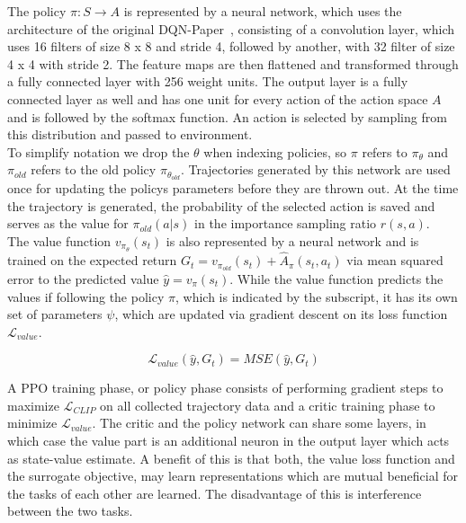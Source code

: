 \documentclass{article}
\begin{document}
\noindent The policy $\pi : S \xrightarrow{} A$ is represented by a neural network, which uses
the architecture of the original DQN-Paper~\cite{DBLP:journals/corr/MnihKSGAWR13}, consisting of
a convolution layer, which uses 16 filters of size 8 x 8 and stride 4,
followed by another, with 32 filter of size 4 x 4 with stride 2. The feature maps are then
flattened and transformed through a fully connected layer with 256 weight units.
The output layer is a fully connected layer as well and has one unit for every
action of the action space $A$ and is followed by the softmax function. 
An action is selected by sampling from this distribution and passed to environment.\\
To simplify notation we drop the $\theta$ when indexing policies, so $\pi$ refers to $\pi_\theta$ and
$\pi_{old}$ refers to the old policy $\pi_{\theta_{old}}$.
Trajectories generated by this network are used once for updating the policys
parameters before they are thrown out. At the time the trajectory is generated,
the probability of the selected action is saved and serves as the value for
$\pi_{old}(a|s)$ in the importance sampling ratio $r(s,a)$.\\
The value function $v_{\pi_\theta}(s_t)$ is also represented by a neural network and
is trained on the expected return $G_t = v_{\pi_{old}}(s_t) + \hat A_\pi(s_t,a_t)$
via mean squared error to the predicted value $\hat y = v_\pi(s_t)$. 
While the value function predicts the values if following the policy $\pi$, which is
indicated by the subscript, it has its own set of parameters $\psi$, which are updated
via gradient descent on its loss function $\mathcal{L}_{value}$.

\begin{equation}
    \mathcal{L}_{value}(\hat y, G_t) = MSE(\hat y, G_t)
\end{equation}

\noindent A PPO training phase, or policy phase consists of performing gradient steps to maximize $\mathcal{L}_{CLIP}$
on all collected trajectory data and a critic training phase to minimize $\mathcal{L}_{value}$.
The critic and the policy network can share some layers, in
which case the value part is an additional neuron in the output layer
which acts as state-value estimate. A benefit of this is that both,
the value loss function and the surrogate objective, may learn representations which are mutual
beneficial for the tasks of each other are learned. The disadvantage of this is interference between
the two tasks.
\end{document}

